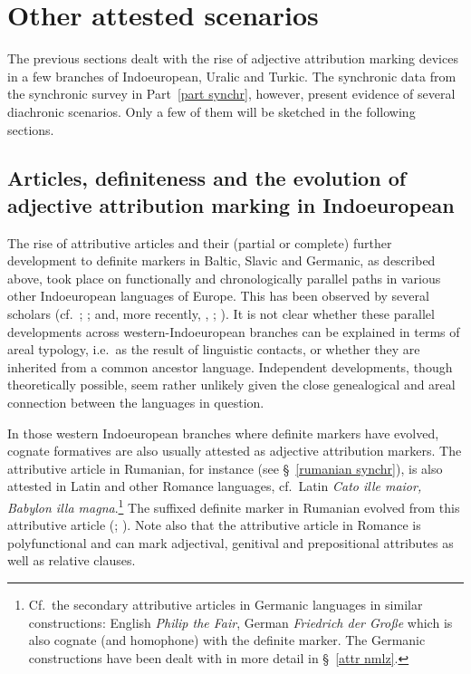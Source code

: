 {\section{Other attested scenarios}
The previous sections dealt with the rise of adjective attribution marking devices in a few branches of Indoeuropean, Uralic and Turkic. The synchronic data from the synchronic survey in Part~\ref{part synchr}, however, present evidence of several diachronic scenarios. Only a few of them will be sketched in the following sections.

\subsection[Articles, definiteness and adjective attribution]{Articles, definiteness and the evolution of adjective attribution marking in Indoeuropean}
The rise of attributive articles and their (partial or complete) further development to definite markers in Baltic, Slavic and Germanic, as described above, took place  on functionally and chronologically parallel paths in various other Indoeuropean languages of Europe. This has been observed by several scholars (cf.~\citealt{brugmann-etal1916}; \citealt{gamillscheg1937}; \citealt{heinrichs1954} and, more recently, \citealt{nocentini1996}, \citealt{philippi1997}; \citealt{himmelmann1997}). It is not clear whether these parallel developments across western-Indoeuropean branches can be explained in terms of areal typology, i.e.~as the result of linguistic contacts, or whether they are inherited from a common ancestor language. Independent developments, though theoretically possible, seem rather unlikely given the close genealogical and areal connection between the languages in question.

In those western Indoeuropean branches where definite markers have evolved, cognate formatives are also usually attested as adjective attribution markers. The attributive article in Rumanian, for instance (see \S~\ref{rumanian synchr}), is also attested in Latin and other Romance languages, cf.~Latin \textit{Cato ille maior, Babylon illa magna}.\footnote{Cf.~the secondary attributive articles in Germanic languages in similar constructions: English \textit{Philip the Fair}, German \textit{Friedrich der Große} which is also cognate (and homophone) with the definite marker. The Germanic constructions have been dealt with in more detail in \S~\ref{attr nmlz}.} The suffixed definite marker in Rumanian evolved from this attributive article (\citealt{gamillscheg1937}; \citealt[5]{nocentini1996}). Note also that the attributive article in Romance is polyfunctional and can mark adjectival, genitival and prepositional attributes as well as relative clauses.

}
